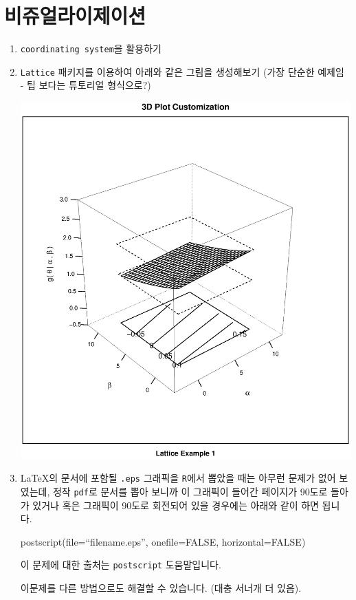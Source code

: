 \documentclass{article}
\begin{document}
\section{비쥬얼라이제이션}
\begin{enumerate}
\item \texttt{coordinating system}을 활용하기

\item \texttt{Lattice} 패키지를 이용하여 아래와 같은 그림을 생성해보기 (가장 단순한 예제임 - 팁 보다는 튜토리얼 형식으로?)

\includegraphics{./img/lattice-fig.eps}


\item \LaTeX 의 문서에 포함될 \texttt{.eps} 그래픽을 \texttt{R}에서 뽑았을 때는 아무런 문제가 없어 보였는데, 정작 \texttt{pdf}로 문서를 뽑아 보니까 이 그래픽이 들어간 페이지가 90도로 돌아가 있거나 혹은 그래픽이 90도로 회전되어 있을 경우에는 아래와 같이 하면 됩니다.

\begin{Schunk}
 \begin{Sinput}
  postscript(file=``filename.eps'', onefile=FALSE, horizontal=FALSE)
 \end{Sinput}
\end{Schunk}

이 문제에 대한 출처는 \texttt{postscript} 도움말입니다.

이문제를 다른 방법으로도 해결할 수 있습니다.  (대충 서너개 더 있음).
\end{enumerate}
\end{document}
